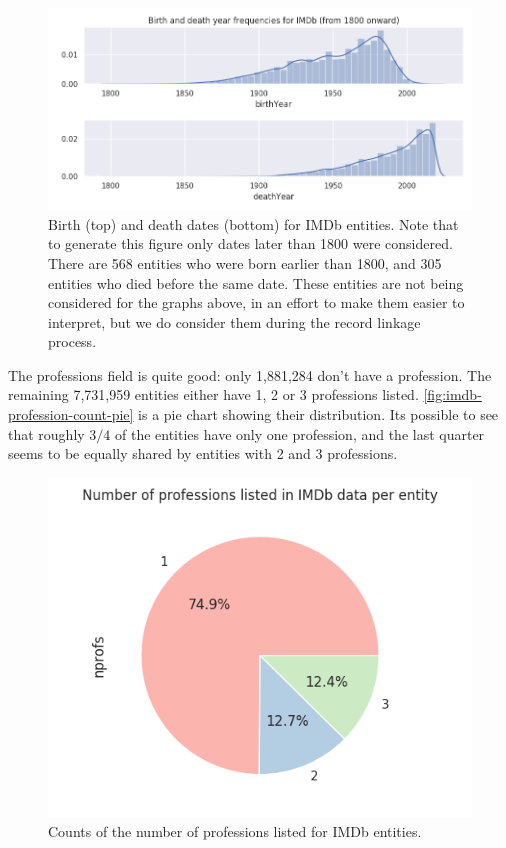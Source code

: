 \documentclass[epsfig,a4paper,11pt,titlepage,twoside,openany]{book}
\begin{document}
\begin{figure}[H]
  \centering \includegraphics[width=.9\textwidth]{birth_and_death_frequencies_imdb}
  \caption{Birth (top) and death dates (bottom) for IMDb entities. Note that to generate this figure only dates later than 1800 were considered. There are 568 entities who were born earlier than 1800, and 305 entities who died before the same date. These entities are not being considered for the graphs above, in an effort to make them easier to interpret, but we do consider them during the record linkage process.}
  \label{fig:imdb-years-distplot}
\end{figure}

The professions field is quite good: only 1,881,284 don't have a profession. The remaining 7,731,959 entities either have 1, 2 or 3 professions listed. \autoref{fig:imdb-profession-count-pie} is a pie chart showing their distribution. Its possible to see that roughly $3/4$ of the entities have only one profession, and the last quarter seems to be equally shared by entities with 2 and 3 professions.

\begin{figure}[H]
  \centering \includegraphics[width=.6\textwidth]{profession_counts_imdb}
  \caption{Counts of the number of professions listed for IMDb entities.}
  \label{fig:imdb-profession-count-pie}
\end{figure}
\end{document}
